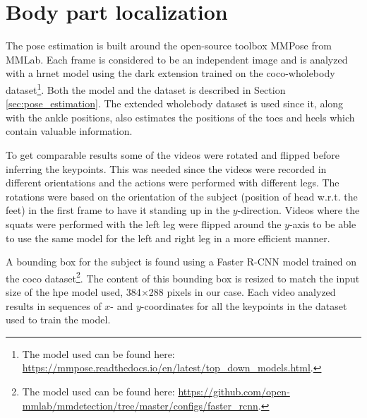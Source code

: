 \section{Body part localization} \label{sec:met-loc}
The pose estimation is built around the open-source toolbox MMPose \cite{mmpose} from MMLab. Each frame is considered to be an independent image and is analyzed with a \gls{hrnet} model using the \gls{dark} extension trained on the \gls{coco}-wholebody dataset\footnote{The model used can be found here: \url{https://mmpose.readthedocs.io/en/latest/top_down_models.html}.}. Both the model and the dataset is described in Section \ref{sec:pose_estimation}. The extended wholebody dataset is used since it, along with the ankle positions, also estimates the positions of the toes and heels which contain valuable information. %

To get comparable results some of the videos were rotated and flipped before inferring the keypoints. This was needed since the videos were recorded in different orientations and the actions were performed with different legs. The rotations were based on the orientation of the subject (position of head w.r.t. the feet) in the first frame to have it standing up in the $y$-direction. Videos where the squats were performed with the left leg were flipped around the $y$-axis to be able to use the same model for the left and right leg in a more efficient manner.

A bounding box for the subject is found using a Faster R-CNN model trained on the \gls{coco} dataset\footnote{The model used can be found here: \url{https://github.com/open-mmlab/mmdetection/tree/master/configs/faster_rcnn}.}. The content of this bounding box is resized to match the input size of the \gls{hpe} model used, 384$\times$288 pixels in our case. Each video analyzed results in sequences of $x$- and $y$-coordinates for all the keypoints in the dataset used to train the model.

